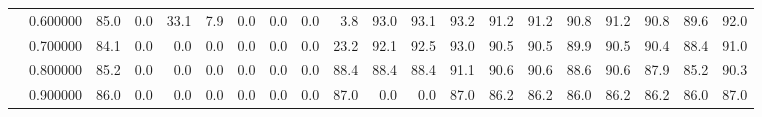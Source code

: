 \begin{tabular}{llrrrrrrrrrrrrrrrrrr}
 & 0.600000 & 85.0 & 0.0 & 33.1 & 7.9 & 0.0 & 0.0 & 0.0 & 3.8 & 93.0 & 93.1 & 93.2 & 91.2 & 91.2 & 90.8 & 91.2 & 90.8 & 89.6 & 92.0 \\
 & 0.700000 & 84.1 & 0.0 & 0.0 & 0.0 & 0.0 & 0.0 & 0.0 & 23.2 & 92.1 & 92.5 & 93.0 & 90.5 & 90.5 & 89.9 & 90.5 & 90.4 & 88.4 & 91.0 \\
 & 0.800000 & 85.2 & 0.0 & 0.0 & 0.0 & 0.0 & 0.0 & 0.0 & 88.4 & 88.4 & 88.4 & 91.1 & 90.6 & 90.6 & 88.6 & 90.6 & 87.9 & 85.2 & 90.3 \\
 & 0.900000 & 86.0 & 0.0 & 0.0 & 0.0 & 0.0 & 0.0 & 0.0 & 87.0 & 0.0 & 0.0 & 87.0 & 86.2 & 86.2 & 86.0 & 86.2 & 86.2 & 86.0 & 87.0 \\
\cline{1-20}
\bottomrule
\end{tabular}
